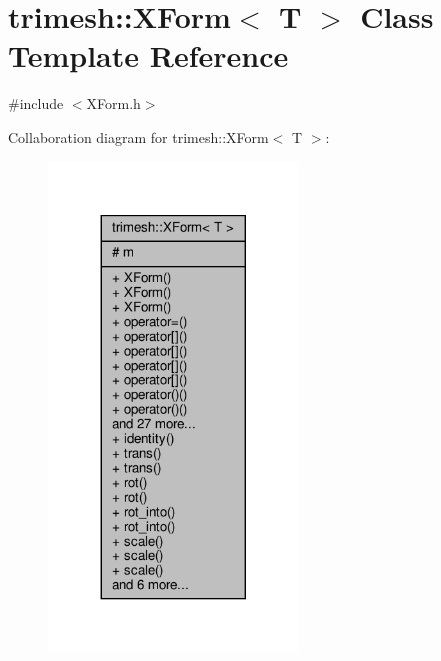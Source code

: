 \hypertarget{classtrimesh_1_1XForm}{}\section{trimesh\+:\+:X\+Form$<$ T $>$ Class Template Reference}
\label{classtrimesh_1_1XForm}


{\ttfamily \#include $<$X\+Form.\+h$>$}



Collaboration diagram for trimesh\+:\+:X\+Form$<$ T $>$\+:\nopagebreak
\begin{figure}[H]
\begin{center}
\leavevmode
\includegraphics[width=188pt]{db/da5/classtrimesh_1_1XForm__coll__graph}
\end{center}
\end{figure}
